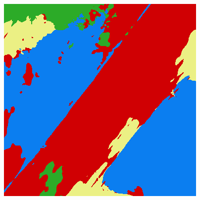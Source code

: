 \begin{figure}
    \includegraphics[width=\UnetPredictionsImageWidth]{images/unet/unet-23D/104483-prediction}


\end{figure}
